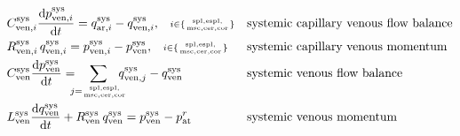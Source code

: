 \documentclass[a4paper,12pt]{report}
\begin{document}
\begin{equation}
\begin{aligned}
&C_{\mathrm{ven},i}^{\mathrm{sys}} \frac{\mathrm{d}p_{\mathrm{ven},i}^{\mathrm{sys}}}{\mathrm{d}t} = q_{\mathrm{ar},i}^{\mathrm{sys}} - q_{\mathrm{ven},i}^{\mathrm{sys}}, \quad\scriptstyle{i\in\{\mathrm{spl,espl,\atop msc,cer,cor}\}}&& \text{systemic capillary venous flow balance}\nonumber\\
&R_{\mathrm{ven},i}^{\mathrm{sys}}\,q_{\mathrm{ven},i}^{\mathrm{sys}} = p_{\mathrm{ven},i}^{\mathrm{sys}}-p_{\mathrm{ven}}^{\mathrm{sys}}, \quad\scriptstyle{i\in\{\mathrm{spl,espl,\atop msc,cer,cor}\}} && \text{systemic capillary venous momentum}\nonumber\\
&C_{\mathrm{ven}}^{\mathrm{sys}} \frac{\mathrm{d}p_{\mathrm{ven}}^{\mathrm{sys}}}{\mathrm{d}t} = \!\!\!\!\sum_{j=\mathrm{spl,espl,\atop msc,cer,cor}}\!\!\!\!\!q_{\mathrm{ven},j}^{\mathrm{sys}}-q_{\mathrm{ven}}^{\mathrm{sys}} && \text{systemic venous flow balance}\nonumber\\
&L_{\mathrm{ven}}^{\mathrm{sys}}\frac{\mathrm{d}q_{\mathrm{ven}}^{\mathrm{sys}}}{\mathrm{d}t} + R_{\mathrm{ven}}^{\mathrm{sys}}\, q_{\mathrm{ven}}^{\mathrm{sys}} = p_{\mathrm{ven}}^{\mathrm{sys}} - p_{\mathrm{at}}^{r} && \text{systemic venous momentum}\nonumber
\end{aligned}
\end{equation}
\end{document}
